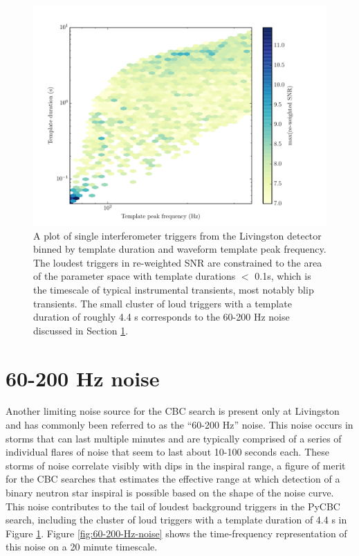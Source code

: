 \begin{figure}[!ht]%
\centering
 \includegraphics[width=\textwidth]{figures/o1-cbc-dq-paper/fpeak-template-duration-hex}
 \caption[Template duration vs. peak frequency in GW150914 analysis]{A plot of single interferometer triggers from the Livingston detector binned by template %
          duration and waveform template peak frequency. The loudest triggers in re-weighted SNR are %
          constrained to the area of the parameter space with template durations $<$ 0.1s, %
          which is the timescale of typical instrumental transients, most notably blip transients. %
          The small cluster of loud triggers with a template duration of roughly 4.4 s corresponds to %
          the 60-200 Hz noise discussed in Section \ref{sec:60-200-hz-noise}.}
\label{fig:fpeak-template-duration-hex}
\end{figure}

\section{60-200 Hz noise}\label{sec:60-200-hz-noise}

Another limiting noise source for the CBC search is present only at Livingston and
has commonly been referred to as the ``60-200 Hz'' noise. This noise occurs in storms that can
last multiple minutes and are typically comprised of a series of individual flares of noise that
seem to last about 10-100 seconds each. These storms of noise correlate visibly with dips in the
inspiral range, a figure of merit for the CBC searches that estimates the effective range at which
detection of a binary neutron star inspiral is possible based on the shape of the noise curve.
This noise contributes to the tail of loudest background triggers in the PyCBC search, including
the cluster of loud triggers with a template duration of 4.4 s in Figure \ref{fig:fpeak-template-duration-hex}.
Figure
\ref{fig:60-200-Hz-noise} shows the time-frequency representation of this noise on a 20 minute timescale.

